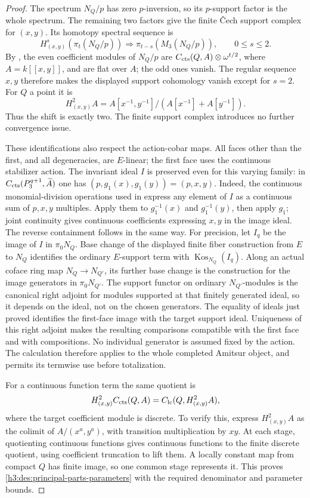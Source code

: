 \begin{proof}
The spectrum $N_Q/p$ has zero $p$-inversion, so its $p$-support
factor is the whole spectrum. The remaining two factors give the
finite \v Cech support complex for $(x,y)$. Its homotopy spectral
sequence is
\[
 H^s_{(x,y)}(\pi_t(N_Q/p))
       \Longrightarrow \pi_{t-s}(M_3(N_Q/p)),\qquad 0\leq s\leq2.
\]
By , the even coefficient modules of
$N_Q/p$ are $C_{\mathrm{cts}}(Q,A)\otimes\omega^{t/2}$,
where $A=k[[x,y]]$, and are flat over $A$; the odd ones vanish.
The regular sequence $x,y$ therefore makes the displayed support
cohomology vanish except for $s=2$. For $Q$ a point it is
\[
 H^2_{(x,y)}A
 =A[x^{-1},y^{-1}]/(A[x^{-1}]+A[y^{-1}]).
\]
Thus the shift is exactly two. The finite support complex introduces
no further convergence issue.

These identifications also respect the action-cobar maps.  All faces
other than the first, and all degeneracies, are $E$-linear; the first face uses the
continuous stabilizer action. The invariant ideal $I$ is preserved
even for this varying family: in
$C_{\mathrm{cts}}(P_3^{q+1},\widetilde A)$ one has
$(p,g_1(x),g_1(y))=(p,x,y)$. Indeed, the continuous monomial-division
operations used in  express any element
of $I$ as a continuous sum of $p,x,y$ multiples. Apply them to
$g_1^{-1}(x)$ and $g_1^{-1}(y)$, then apply $g_1$; joint continuity
gives continuous coefficients expressing $x,y$ in the image ideal.
The reverse containment follows in the same way. For precision, let $I_q$ be the image of $I$ in $\pi_0N_Q$.
Base change of the displayed finite fiber construction from $E$ to
$N_Q$ identifies the ordinary $E$-support term with
$\operatorname{Kos}_{N_Q}(I_q)$.  Along an actual coface ring map
$N_Q\to N_{Q'}$, its further base change is the construction for the
image generators in $\pi_0N_{Q'}$.  The support functor on ordinary
$N_{Q'}$-modules is the canonical right adjoint for modules supported
at that finitely generated ideal, so it depends on the ideal, not on
the chosen generators.  The equality of ideals just proved identifies
the first-face image with the target support ideal.  Uniqueness of this
right adjoint makes the resulting comparisons compatible with the first face and with compositions.  No individual generator
is assumed fixed by the action. The calculation therefore applies to the
whole completed Amitsur object, and 
permits its termwise use before totalization.


For a continuous function term the same quotient is
\begin{equation}\label{h3:des:principal-parts-parameters}
 H^2_{(x,y)}C_{\mathrm{cts}}(Q,A)
     =C_{\mathrm{lc}}(Q,H^2_{(x,y)}A),
\end{equation}
where the target coefficient module is discrete.
To verify this, express \(H^2_{(x,y)}A\) as the colimit of
\(A/(x^a,y^a)\), with transition multiplication by \(xy\).
At each stage, quotienting continuous functions gives continuous
functions to the finite discrete quotient, using coefficient
truncation to lift them.  A locally constant map from compact
\(Q\) has finite image, so one common stage represents it.
This proves \eqref{h3:des:principal-parts-parameters} with the
required denominator and parameter bounds.


\end{proof}
